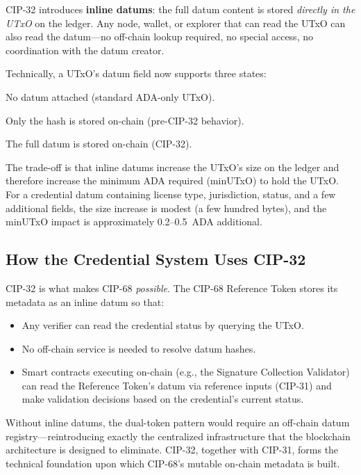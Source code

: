 CIP-32 introduces \textbf{inline datums}: the full datum content is stored
\emph{directly in the UTxO} on the ledger.  Any node, wallet, or explorer
that can read the UTxO can also read the datum---no off-chain lookup
required, no special access, no coordination with the datum creator.

Technically, a UTxO's datum field now supports three states:
\begin{description}[nosep, leftmargin=1.5em]
  \item[None] No datum attached (standard ADA-only UTxO).
  \item[Datum Hash] Only the hash is stored on-chain (pre-CIP-32 behavior).
  \item[Inline Datum] The full datum is stored on-chain (CIP-32).
\end{description}

The trade-off is that inline datums increase the UTxO's size on the ledger
and therefore increase the minimum ADA required (minUTxO) to hold the UTxO.
For a credential datum containing license type, jurisdiction, status, and a
few additional fields, the size increase is modest (a few hundred bytes),
and the minUTxO impact is approximately 0.2--0.5~ADA additional.

\subsection{How the Credential System Uses CIP-32}

CIP-32 is what makes CIP-68 \emph{possible}.  The CIP-68 Reference Token
stores its metadata as an inline datum so that:

\begin{itemize}[nosep]
  \item Any verifier can read the credential status by querying the UTxO.
  \item No off-chain service is needed to resolve datum hashes.
  \item Smart contracts executing on-chain (e.g., the Signature Collection
    Validator) can read the Reference Token's datum via reference inputs
    (CIP-31) and make validation decisions based on the credential's current
    status.
\end{itemize}

Without inline datums, the dual-token pattern would require an off-chain
datum registry---reintroducing exactly the centralized infrastructure that
the blockchain architecture is designed to eliminate.  CIP-32, together with
CIP-31, forms the technical foundation upon which CIP-68's mutable on-chain
metadata is built.


